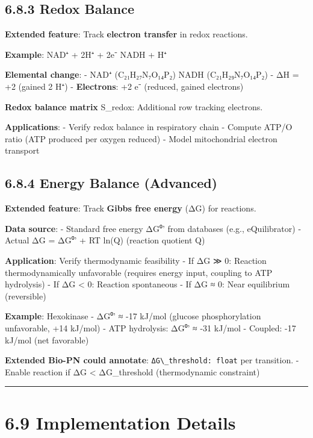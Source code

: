 \hypertarget{redox-balance}{%
\subsection{6.8.3 Redox Balance}\label{redox-balance}}

\textbf{Extended feature}: Track \textbf{electron transfer} in redox
reactions.

\textbf{Example}: NAD⁺ + 2H⁺ + 2e⁻ \textrightarrow NADH + H⁺

\textbf{Elemental change}: - NAD⁺ (C₂₁H₂₇N₇O₁₄P₂) \textrightarrow NADH (C₂₁H₂₉N₇O₁₄P₂)
- ΔH = +2 (gained 2 H⁺) - \textbf{Electrons}: +2 e⁻ (reduced, gained
electrons)

\textbf{Redox balance matrix} S\_redox: Additional row tracking
electrons.

\textbf{Applications}: - Verify redox balance in respiratory chain -
Compute ATP/O ratio (ATP produced per oxygen reduced) - Model
mitochondrial electron transport

\hypertarget{energy-balance-advanced}{%
\subsection{6.8.4 Energy Balance
(Advanced)}\label{energy-balance-advanced}}

\textbf{Extended feature}: Track \textbf{Gibbs free energy} (ΔG) for
reactions.

\textbf{Data source}: - Standard free energy ΔG⁰' from databases (e.g.,
eQuilibrator) - Actual ΔG = ΔG⁰' + RT ln(Q) (reaction quotient Q)

\textbf{Application}: Verify thermodynamic feasibility - If ΔG ≫ 0:
Reaction thermodynamically unfavorable (requires energy input, coupling
to ATP hydrolysis) - If ΔG \textless{} 0: Reaction spontaneous - If ΔG ≈
0: Near equilibrium (reversible)

\textbf{Example}: Hexokinase - ΔG⁰' ≈ -17 kJ/mol (glucose
phosphorylation unfavorable, +14 kJ/mol) - ATP hydrolysis: ΔG⁰' ≈ -31
kJ/mol - Coupled: -17 kJ/mol (net favorable)

\textbf{Extended Bio-PN could annotate}:
\passthrough{\lstinline!ΔG\_threshold: float!} per transition. - Enable
reaction if ΔG \textless{} ΔG\_threshold (thermodynamic constraint)

\begin{center}\rule{0.5\linewidth}{0.5pt}\end{center}

\hypertarget{implementation-details}{%
\section{6.9 Implementation Details}\label{implementation-details}}

